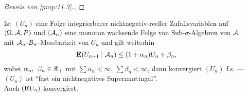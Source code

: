 \begin{proof}[Beweis von \ref{prop:11.3}.]
% 
% 
\end{proof}

\begin{cor}
\label{cor:11.1}
Ist $(U_{n})$ eine Folge integrierbarer nichtnegativ-reeller Zufallsvariablen
auf $(\Omega, {\AA},P)$ und $({\AA}_{n})$ eine monoton wachsende Folge von
Sub-$\sigma $-Algebren von ${\AA}$ mit ${\AA}_{n}$-${\BB}_{+}$-Messbarkeit
von $U_{n}$ und gilt weiterhin
\begin{align*}
\E(U_{n+1}\mid {\AA}_{n})\leq (1+\alpha _{n}) U_{n} +\beta _{n}, 
\end{align*}
wobei $\alpha _{n}, \;\, \beta _{n} \in \R_{+}$ mit $\sum \alpha_{n} < \infty$,
$\sum \beta _{n}< \infty$, dann konvergiert $(U_{n})$ f.s. --- $(U_{n})$ ist
``fast ein nichtnegatives Supermartingal''.\\ Auch $(\E U_{n})$
konvergiert.\fishhere
\end{cor}

